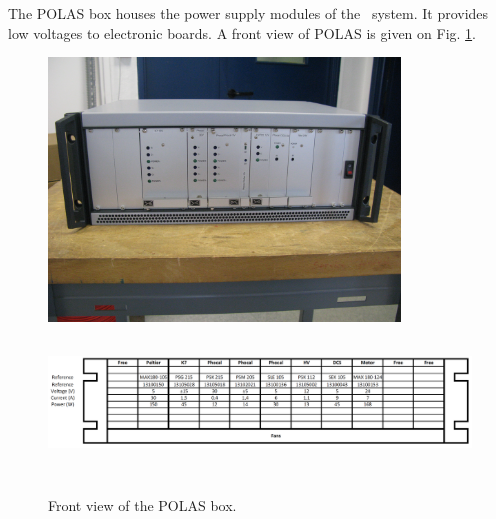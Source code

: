 The POLAS box houses the power supply modules of the \las~system. It provides low voltages to electronic boards. A front view of POLAS is given on Fig. \ref{fig:laspolas}.

\begin{figure}[htbp]
\centering
\includegraphics[height=7cm]{figures/polas_photo.jpg}
\includegraphics[height=4cm,width=18cm]{figures/polas_faceavant.pdf}
\caption{Front view of the POLAS box.}\label{fig:laspolas}
\end{figure}